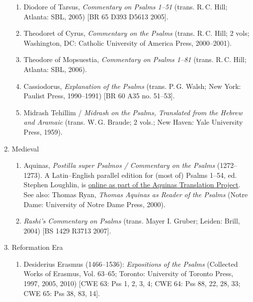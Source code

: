 \documentclass[titlepage]{article}
\begin{document}
\begin{enumerate}
\begin{enumerate}
	\item Diodore of Tarsus, \emph{Commentary on Psalms 1--51} (trans. R.\,C. Hill; Atlanta: SBL, 2005) [BR 65 D393 D5613 2005].

	\item Theodoret of Cyrus, \emph{Commentary on the Psalms} (trans. R.\,C. Hill; 2 vols; Washington, DC: Catholic University of America Press, 2000--2001).

	\item Theodore of Mopsuestia, \emph{Commentary on Psalms 1--81} (trans. R.\,C. Hill; Atlanta: SBL, 2006).

	\item Cassiodorus, \emph{Explanation of the Psalms} (trans. P.\,G. Walsh; New York: Paulist Press, 1990--1991) [BR 60 A35 no. 51--53].

	\item Midrash Tehillim / \emph{Midrash on the Psalms, Translated from the Hebrew and Aramaic} (trans. W.\,G. Braude; 2 vols.; New Haven: Yale University Press, 1959).

  \end{enumerate}
 \item Medieval
  \begin{enumerate}

	\item Aquinas, \emph{Postilla super Psalmos / Commentary on the Psalms} (1272--1273). A Latin--English parallel edition for (most of) Psalms 1--54, ed. Stephen Loughlin, is \href{http://hosted.desales.edu/w4/philtheo/loughlin/ATP/}{online as part of the Aquinas Translation Project}. See also: Thomas Ryan, \emph{Thomas Aquinas as Reader of the Psalms} (Notre Dame: University of Notre Dame Press, 2000).

	\item \emph{Rashi’s Commentary on Psalms} (trans. Mayer I. Gruber; Leiden: Brill, 2004) [BS 1429 R3713 2007].%

  \end{enumerate}
 \item Reformation Era
  \begin{enumerate}

	\item Desiderius Erasmus (1466--1536): \emph{Expositions of the Psalms} (Collected Works of Erasmus, Vol. 63--65; Toronto: University of Toronto Press, 1997, 2005, 2010) [CWE 63: Pss 1, 2, 3, 4; CWE 64: Pss 88, 22, 28, 33; CWE 65: Pss 38, 83, 14].


\end{enumerate}
\end{enumerate}
\end{document}

